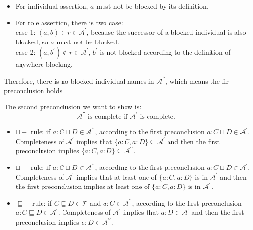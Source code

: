 \documentclass[12pt]{article}
\begin{document}
\begin{itemize}
\begin{equation}
            \nonumber
        \end{equation} \par
        \begin{itemize}
            \item For individual assertion, $a$ must not be blocked by its definition.
            \item For role assertion, there is two case: \\
            case 1: $(a, b) \in r \in \mathcal{A}^{'}$, because the successor of a blocked individual is also blocked, so $a$ must not be blocked. \\
            case 2: $(a, b^{'}) \not\in r \in \mathcal{A}^{'}$, $b^{\prime}$ is not blocked according to the definition of anywhere blocking.
        \end{itemize} \par
        Therefore, there is no blocked individual names in $\mathcal{A}^{\prime\prime}$, which means the fir  preconclusion holds. \par
        The second preconclusion we want to show is:
        \begin{equation}
            \mathcal{A}^{\prime\prime} \text{ is complete if } \mathcal{A}^{\prime} \text{ is complete. }
            \nonumber
        \end{equation}
        \begin{itemize}
            \item $\sqcap-$ rule: if $a: C \sqcap D \in \mathcal{A}^{\prime \prime}$, according to the first preconclusion $a: C \sqcap D \in \mathcal{A}^{\prime}$. Completeness of $\mathcal{A}^{\prime}$ implies that $\{a: C, a: D\} \subseteq \mathcal{A}^{\prime}$ and then the first preconclusion implies $\{a: C, a: D\} \subseteq \mathcal{A}^{\prime \prime}$.
            \item $\sqcup-$ rule: if $a: C \sqcup D \in \mathcal{A}^{\prime \prime}$, according to the first preconclusion $a: C \sqcup D \in \mathcal{A}^{\prime}$. Completeness of $\mathcal{A}^{\prime}$ implies that at least one of $\{a: C, a: D\}$ is in $\mathcal{A}^{\prime}$ and then the first preconclusion implies at least one of $\{a: C, a: D\}$ is in $\mathcal{A}^{\prime \prime}$.
            \item $\sqsubseteq-$ rule: if $C \sqsubseteq D \in \mathcal{T}$ and $a: C \in \mathcal{A}^{\prime \prime}$, according to the first preconclusion $a: C \sqsubseteq D \in \mathcal{A}^{\prime}$. Completeness of $\mathcal{A}^{\prime}$ implies that $a: D \in \mathcal{A}^{\prime}$ and then the first preconclusion implies $a: D \in \mathcal{A}^{\prime \prime}$.

\end{itemize}
\end{itemize}
\end{document}
